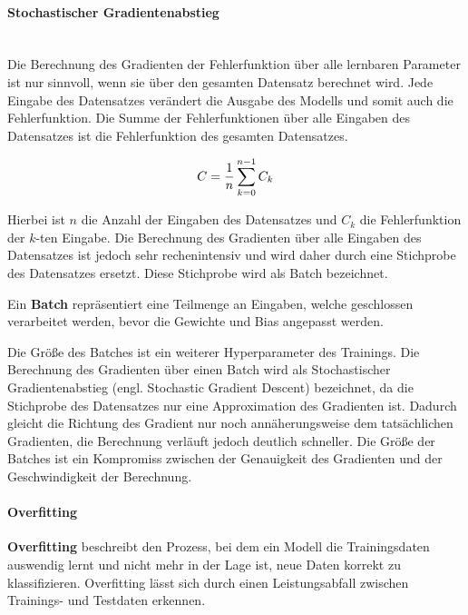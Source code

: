 \paragraph{Stochastischer Gradientenabstieg}\mbox{}\\
Die Berechnung des Gradienten der Fehlerfunktion über alle lernbaren Parameter ist nur sinnvoll, wenn sie über den gesamten Datensatz berechnet wird.
Jede Eingabe des Datensatzes verändert die Ausgabe des Modells und somit auch die Fehlerfunktion.
Die Summe der Fehlerfunktionen über alle Eingaben des Datensatzes ist die Fehlerfunktion des gesamten Datensatzes.

\begin{equation}
    C = \frac{1}{n}\sum_{k=0}^{n-1}C_k\\
\end{equation}

Hierbei ist $n$ die Anzahl der Eingaben des Datensatzes und $C_k$ die Fehlerfunktion der $k$-ten Eingabe.
Die Berechnung des Gradienten über alle Eingaben des Datensatzes ist jedoch sehr rechenintensiv und wird daher durch eine Stichprobe des Datensatzes ersetzt.
Diese Stichprobe wird als Batch bezeichnet.\\

\begin{definition}\label{def:batch}
    Ein \textbf{Batch} repräsentiert eine Teilmenge an Eingaben, welche geschlossen verarbeitet werden, bevor die Gewichte und Bias angepasst werden.
\end{definition}

Die Größe des Batches ist ein weiterer Hyperparameter des Trainings.
Die Berechnung des Gradienten über einen Batch wird als Stochastischer Gradientenabstieg (engl. Stochastic Gradient Descent) bezeichnet, da die Stichprobe des Datensatzes nur eine Approximation des Gradienten ist.
Dadurch gleicht die Richtung des Gradient nur noch annäherungsweise dem tatsächlichen Gradienten, die Berechnung verläuft jedoch deutlich schneller.
Die Größe der Batches ist ein Kompromiss zwischen der Genauigkeit des Gradienten und der Geschwindigkeit der Berechnung.\\

\paragraph{Overfitting}
\begin{definition}\label{def:overfitting}
    \textbf{Overfitting} beschreibt den Prozess, bei dem ein Modell die Trainingsdaten auswendig lernt und nicht mehr in der Lage ist,
    neue Daten korrekt zu klassifizieren. Overfitting lässt sich durch einen Leistungsabfall zwischen Trainings- und Testdaten erkennen.
\end{definition}

